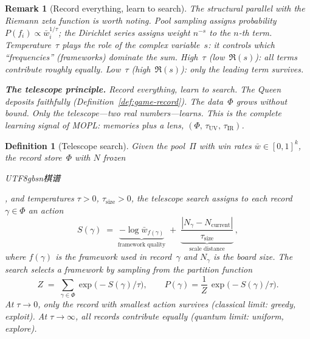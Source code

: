 \documentclass[11pt,a4paper]{article}
\newtheorem{definition}[theorem]{Definition}
\newtheorem{remark}[theorem]{Remark}
\begin{document}
\begin{remark}[Record everything, learn to search]
\noindent
The structural parallel with the Riemann zeta function is
worth noting.
Pool sampling assigns probability
$P(f_i) \propto \bar{w}_i^{1/\tau}$;
the Dirichlet series assigns weight $n^{-s}$ to the
$n$-th term.
Temperature~$\tau$ plays the role of the complex variable~$s$:
it controls which ``frequencies'' (frameworks) dominate the
sum.
High~$\tau$ (low~$\Re(s)$): all terms contribute roughly
equally.
Low~$\tau$ (high~$\Re(s)$): only the leading term survives.

\medskip\noindent
\textbf{The telescope principle.}\;
\emph{Record everything, learn to search.}
The Queen deposits faithfully (Definition~\ref{def:game-record}).
The data~$\Phi$ grows without bound.
Only the telescope---two real numbers---learns.
This is the complete learning signal of MOPL:
memories plus a lens, $(\Phi,\, \tau_{\text{UV}},\, \tau_{\text{IR}})$.
\end{remark}

\begin{definition}[Telescope search]%
\label{def:telescope-search}
Given the pool~$\Pi$ with win rates
$\bar{w} \in [0,1]^k$,
the record store~$\Phi$ with $N$ frozen
\begin{CJK}{UTF8}{gbsn}棋谱\end{CJK},
and temperatures $\tau > 0$, $\tau_{\text{size}} > 0$,
the \emph{telescope search} assigns to each record
$\gamma \in \Phi$ an action
\begin{equation}\label{eq:action}
  S(\gamma)
  \;=\;
  \underbrace{-\log \bar{w}_{f(\gamma)}}_
    {\text{framework quality}}
  \;+\;
  \underbrace{\frac{|N_\gamma - N_{\text{current}}|}
    {\tau_{\text{size}}}}_
    {\text{scale distance}}\,,
\end{equation}
where $f(\gamma)$ is the framework used in record~$\gamma$
and $N_\gamma$ is the board size.
The search selects a framework by sampling from the
partition function
\begin{equation}\label{eq:partition}
  Z \;=\; \sum_{\gamma \in \Phi}
  \exp\!\bigl(-S(\gamma)/\tau\bigr),
  \qquad
  P(\gamma) = \frac{1}{Z}\,
  \exp\!\bigl(-S(\gamma)/\tau\bigr).
\end{equation}
At $\tau \to 0$, only the record with smallest action
survives (classical limit: greedy, exploit).
At $\tau \to \infty$, all records contribute equally
(quantum limit: uniform, explore).
\end{definition}
\end{document}
